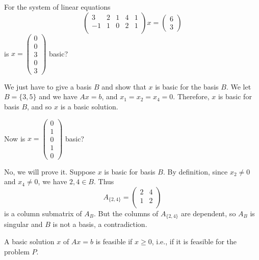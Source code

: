     \begin{problem}[]
    For the system of linear equations
    $$ \begin{pmatrix}
            3  & 2 & 1 & 4 & 1 \\
            -1 & 1 & 0 & 2 & 1 \\
        \end{pmatrix} x = \begin{pmatrix}
            6 \\ 3
        \end{pmatrix}$$
    is $x = \begin{pmatrix}
            0 \\ 0 \\ 3 \\ 0 \\ 3
        \end{pmatrix}$ basic?
    
    We just have to give a basis $B$ and show that $x$ is basic for the basis $B$. We let $B = \{3,5\}$ and we have $Ax = b$, and $x_1 = x_2 = x_4 = 0$. Therefore, $x$ is basic for basis $B$, and so $x$ is a basic solution.
    
    \bigskip
    Now is $x = \begin{pmatrix}
            0 \\ 1 \\ 0 \\ 1 \\ 0
        \end{pmatrix}$ basic?
    
    No, we will prove it. Suppose $x$ is basic for basis $B$. By definition, since $x_2 \neq 0$ and $x_4 \neq 0$, we have $2,4 \in B$. Thus $$A_{\{2,4\}} = \begin{pmatrix}
            2 & 4 \\
            1 & 2 \\
        \end{pmatrix}$$ is a column submatrix of $A_B$. But the columns of $A_{\{2,4\}}$ are dependent, so $A_B$ is singular and $B$ is not a basis, a contradiction.
    \end{problem}
    \begin{definition}
        A basic solution $x$ of $Ax = b$ is feasible if $x \geq 0$, i.e., if it is feasible for the problem $P$.
    \end{definition}
